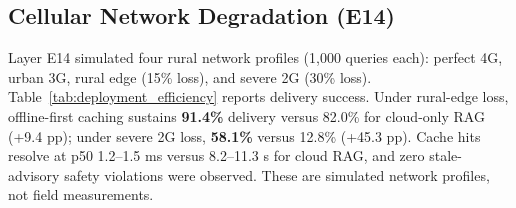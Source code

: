 \subsection{Cellular Network Degradation (E14)}
Layer E14 simulated four rural network profiles (1{,}000 queries each): perfect 4G, urban 3G, rural edge (15\% loss), and severe 2G (30\% loss). Table~\ref{tab:deployment_efficiency} reports delivery success. Under rural-edge loss, offline-first caching sustains \textbf{91.4\%} delivery versus 82.0\% for cloud-only RAG (+9.4 pp); under severe 2G loss, \textbf{58.1\%} versus 12.8\% (+45.3 pp). Cache hits resolve at p50 1.2--1.5 ms versus 8.2--11.3 s for cloud RAG, and zero stale-advisory safety violations were observed. These are simulated network profiles, not field measurements.

